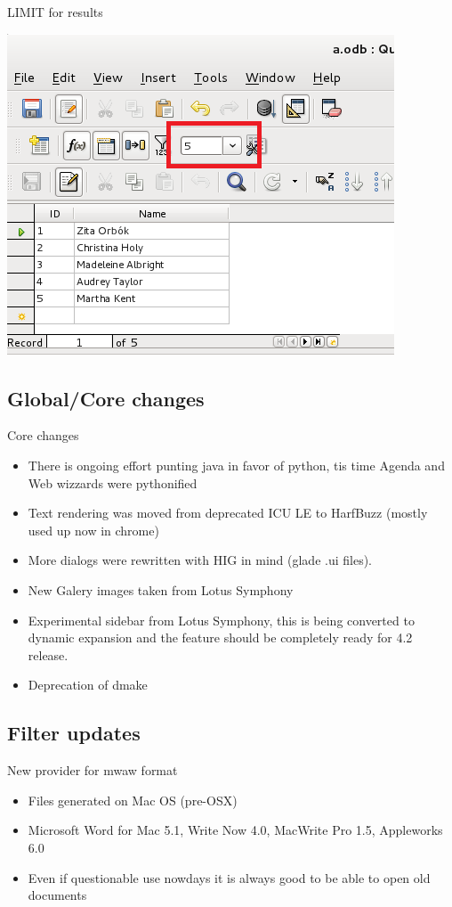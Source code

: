 \documentclass{beamer}
\begin{document}
\begin{frame}{LIMIT for results}
	\begin{center}
	\includegraphics[width= 0.7\linewidth]{limit-base.png}
	\end{center}
\end{frame}

\subsection{Global/Core changes}

\begin{frame}[t]{Core changes}
	\begin{itemize}
	\item There is ongoing effort punting java in favor of python, tis time Agenda and Web wizzards were pythonified
	\item Text rendering was moved from deprecated ICU LE to HarfBuzz (mostly used up now in chrome)
	\item More dialogs were rewritten with HIG in mind (glade .ui files).
	\item New Galery images taken from Lotus Symphony
	\item Experimental sidebar from Lotus Symphony, this is being converted to dynamic expansion and the feature should be completely ready for 4.2 release.
	\item Deprecation of dmake
	\end{itemize}
\end{frame}

\subsection{Filter updates}

\begin{frame}[t]{New provider for mwaw format}
	\begin{itemize}
	\item Files generated on Mac OS (pre-OSX)
	\item Microsoft Word for Mac 5.1, Write Now 4.0, MacWrite Pro 1.5, Appleworks 6.0
	\item Even if questionable use nowdays it is always good to be able to open old documents
	\end{itemize}
\end{frame}
\end{document}
